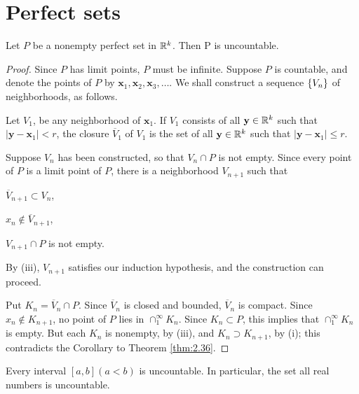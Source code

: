 \section{Perfect sets}

\begin{thm}\label{thm:2.43}
    Let $P$ be a nonempty perfect set in ${\protect\mathbb R}^k$. Then P is uncountable.    
\end{thm}
\begin{proof}
    Since $P$ has limit points, $P$ must be infinite. 
    Suppose $P$ is countable, and denote the points of $P$ by $\mathbf{x}_{1}, \mathbf{x}_{2}, \mathbf{x}_{3},\dots$. 
    We shall construct a sequence $\protect\{V_n\}$ of neighborhoods, as follows.
    
    Let $V_{1}$, be any neighborhood of $\mathbf{x}_1$. 
    If $V_{1}$ consists of all $\mathbf{y} \in {\protect\mathbb R}^k$ 
    such that $\left| \mathbf{y} - \mathbf{x}_1 \right| < r$, 
    the closure $\overline{V}_{1}$ of $V_1$ is the set of all $\mathbf{y} \in {\protect\mathbb R}^k$ 
    such that $\left| \mathbf{y} - \mathbf{x}_1 \right| \leq r$.

    Suppose $V_n$ has been constructed, 
    so that $V_n \cap P$ is not empty. 
    Since every point of $P$ is a limit point of $P$, 
    there is a neighborhood $V_{n+1}$ such that 
    \begin{inparaenum}[(i)]
        \item $\overline{V}_{n+1} \subset V_n$,
        \item $x_n \not\in \overline{V}_{n+1}$,
        \item $V_{n+1} \cap P$ is not empty. 
    \end{inparaenum}
    By (iii), $V_{n+1}$ satisfies our induction hypothesis, 
    and the construction can proceed.
    
    Put $K_n = \overline{V}_n \cap P$. 
    Since $\overline{V}_n$ is closed and bounded, 
    $\overline{V}_n$ is compact.
    Since $x_n \not\in K_{n+1}$, 
    no point of $P$ lies in $\cap_1^{\infty} K_n$.
    Since $K_n \subset P$, 
    this implies that $\cap_1^{\infty} K_n$ is empty. 
    But each $K_n$ is nonempty, 
    by (iii), and $K_n \supset K_{n+1}$,
    by (i); this contradicts the Corollary to Theorem \ref{thm:2.36}.
\end{proof}

\begin{myCorollary*}
	Every interval $[a, b] (a <b)$ is uncountable. In particular, the set
	all real numbers is uncountable.
\end{myCorollary*}


